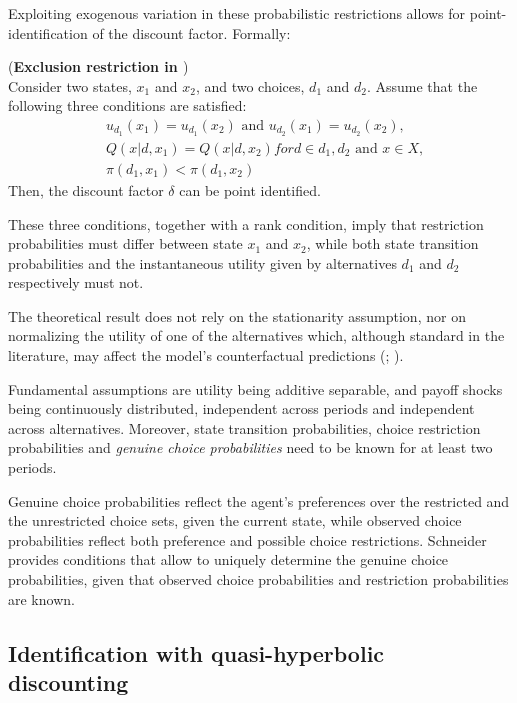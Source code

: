 Exploiting exogenous variation in these probabilistic restrictions allows for point-identification of the discount factor. Formally:

\begin{proposition} (\textbf{Exclusion restriction in \textcite{Schneider2020}}) \label{def:res-schneider} \\
Consider two states, $x_1$ and $x_2$, and two choices, $d_1$ and $d_2$. Assume that the following three conditions are satisfied:
\begin{align*}
& u_{d_1}(x_1) = u_{d_1}(x_2) \text{ and } u_{d_2}(x_1) = u_{d_2}(x_2), \\
& Q(x | d, x_1) = Q(x | d, x_2)  for  d \in {d_1, d_2} \text{ and } x \in X, \\
& \pi(d_1, x_1) < \pi(d_1, x_2)
\end{align*}
Then, the discount factor $\delta$ can be point identified.
\end{proposition}

These three conditions, together with a rank condition, imply that restriction probabilities must differ between state $x_1$ and $x_2$, while both state transition probabilities and the instantaneous utility given by alternatives $d_1$ and $d_2$ respectively must not.

The theoretical result does not rely on the stationarity assumption, nor on normalizing the utility of one of the alternatives which, although standard in the literature, may affect the model's counterfactual predictions (\cite{NoretsTang2013}; \cite{Kalouptsidi2016}).  

Fundamental assumptions are utility being additive separable, and payoff shocks being continuously distributed, independent across periods and independent across alternatives. Moreover, state transition probabilities, choice restriction probabilities and \textit{genuine choice probabilities} need to be known for at least two periods.

Genuine choice probabilities reflect the agent's preferences over the restricted and the unrestricted choice sets, given the current state, while observed choice probabilities reflect both preference and possible choice restrictions. Schneider provides conditions that allow to uniquely determine the genuine choice probabilities, given that observed choice probabilities and restriction probabilities are known. 

\subsection{Identification with quasi-hyperbolic discounting}

